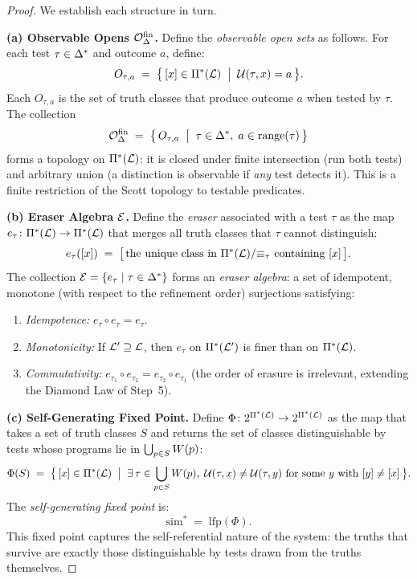 \begin{proof}
We establish each structure in turn.

\medskip
\noindent\textbf{(a) Observable Opens $\mathcal{O}^{\mathrm{fin}}_\Delta$.}
Define the \emph{observable open sets} as follows.  For each test
$\tau \in \Delta^*$ and outcome $a$, define:
\[
  O_{\tau, a} \;=\; \bigl\{\, [x] \in \Pi^*(\mathcal{L})
    \;\bigm|\; \mathcal{U}(\tau, x) = a \,\bigr\}.
\]
Each $O_{\tau, a}$ is the set of truth classes that produce outcome $a$
when tested by $\tau$.  The collection
\[
  \mathcal{O}^{\mathrm{fin}}_\Delta \;=\; \bigl\{\, O_{\tau, a} \;\bigm|\; \tau \in \Delta^*,\;
    a \in \mathrm{range}(\tau) \,\bigr\}
\]
forms a topology on $\Pi^*(\mathcal{L})$: it is closed under finite intersection
(run both tests) and arbitrary union (a distinction is observable if
\emph{any} test detects it).  This is a finite restriction of the
Scott topology \citep{scott1970} to testable predicates.

\medskip
\noindent\textbf{(b) Eraser Algebra $\mathcal{E}$.}
Define the \emph{eraser} associated with a test $\tau$ as the map
$e_\tau \colon \Pi^*(\mathcal{L}) \to \Pi^*(\mathcal{L})$ that merges all truth
classes that $\tau$ cannot distinguish:
\[
  e_\tau([x]) \;=\; \bigl[\, \text{the unique class in }
    \Pi^*(\mathcal{L}) / {\equiv_\tau} \text{ containing } [x] \,\bigr].
\]
The collection $\mathcal{E} = \{e_\tau \mid \tau \in \Delta^*\}$ forms an
\emph{eraser algebra}: a set of idempotent, monotone (with respect to
the refinement order) surjections satisfying:
\begin{enumerate}[nosep, label=(E\arabic*)]
  \item \emph{Idempotence:} $e_\tau \circ e_\tau = e_\tau$.
  \item \emph{Monotonicity:} If $\mathcal{L}' \supseteq \mathcal{L}$, then
        $e_\tau$ on $\Pi^*(\mathcal{L}')$ is finer than on $\Pi^*(\mathcal{L})$.
  \item \emph{Commutativity:} $e_{\tau_1} \circ e_{\tau_2} =
        e_{\tau_2} \circ e_{\tau_1}$ (the order of erasure is irrelevant,
        extending the Diamond Law of Step~5).
\end{enumerate}

\medskip
\noindent\textbf{(c) Self-Generating Fixed Point.}
Define $\Phi \colon 2^{\Pi^*(\mathcal{L})} \to 2^{\Pi^*(\mathcal{L})}$ as the map
that takes a set of truth classes $S$ and returns the set of classes
distinguishable by tests whose programs lie in $\bigcup_{p \in S} W(p)$:
\[
  \Phi(S) \;=\; \bigl\{\, [x] \in \Pi^*(\mathcal{L})
    \;\bigm|\; \exists\, \tau \in \bigcup_{p \in S} W(p),\;
    \mathcal{U}(\tau, x) \neq \mathcal{U}(\tau, y)
    \text{ for some } y \text{ with } [y] \neq [x] \,\bigr\}.
\]
The \emph{self-generating fixed point} is:
\[
  \mathrm{sim}^* \;=\; \mathrm{lfp}(\Phi).
\]
This fixed point captures the self-referential nature of the system:
the truths that survive are exactly those distinguishable by tests
drawn from the truths themselves.


\end{proof}
